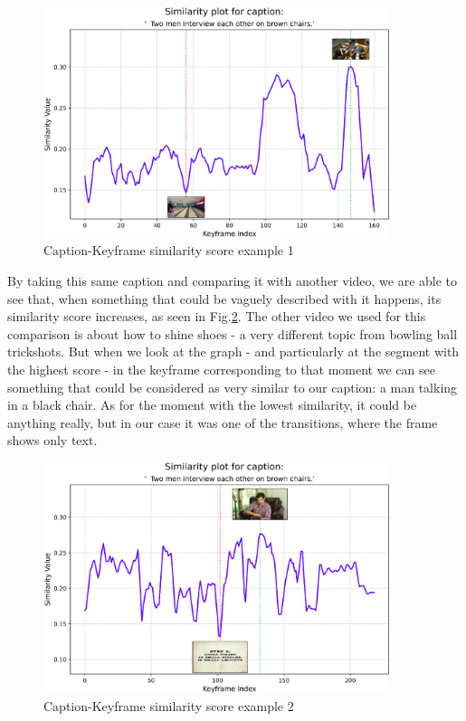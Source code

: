 \documentclass[runningheads]{llncs}
\begin{document}
\begin{figure}[!htb]
  \centering
  \includegraphics[width=0.9\textwidth, clip=true]{../figures/lang_vis_temp_similarity1.png}
  \caption{Caption-Keyframe similarity score example 1}\label{cap-frame-sim-score-1}
\end{figure}

By taking this same caption and comparing it with another video, we are able to see that, when something that could be vaguely described with it happens, its similarity score increases, as seen in Fig.\ref{cap-frame-sim-score-2}. The other video we used for this comparison is about how to shine shoes - a very different topic from bowling ball trickshots. But when we look at the graph - and particularly at the segment with the highest score - in the keyframe corresponding to that moment we can see something that could be considered as very similar to our caption: a man talking in a black chair. As for the moment with the lowest similarity, it could be anything really, but in our case it was one of the transitions, where the frame shows only text.

\begin{figure}[!htb]
  \centering
  \includegraphics[width=0.9\textwidth, clip=true]{../figures/lang_vis_temp_similarity2.png}
  \caption{Caption-Keyframe similarity score example 2}\label{cap-frame-sim-score-2}
\end{figure}
\end{document}
